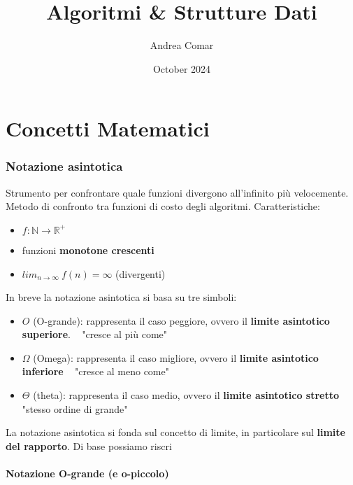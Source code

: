 \documentclass{article}
\title{Algoritmi \& Strutture Dati}
\author{Andrea Comar}
\date{October 2024}
\begin{document}
\maketitle
\newpage
\tableofcontents
\newpage

\part{Concetti Matematici}
\section{Notazione asintotica} %
Strumento per confrontare quale funzioni divergono all'infinito più velocemente. Metodo di confronto 
tra funzioni di costo degli algoritmi. Caratteristiche:
\begin{itemize}
    \item $f: \mathbb{N} \rightarrow \mathbb{R^+}$
    \item funzioni \textbf{monotone crescenti}
    \item $lim_{n \rightarrow \infty} \ f(n) = \infty$ (divergenti)
\end{itemize}

In breve la notazione asintotica si basa su tre simboli:
\begin{itemize}
    \item $O$ (O-grande): rappresenta il caso peggiore, ovvero il \textbf{limite asintotico superiore}. ~ "cresce al più come"
    \item $\Omega$ (Omega): rappresenta il caso migliore, ovvero il \textbf{limite asintotico inferiore} ~ "cresce al meno come"
    \item $\Theta$ (theta): rappresenta il caso medio, ovvero il \textbf{limite asintotico stretto} ~ "stesso ordine di grande"
\end{itemize}
La notazione asintotica si fonda sul concetto di limite, in particolare sul \textbf{limite del rapporto}. Di base possiamo riscri


\subsection{Notazione O-grande (e o-piccolo)} %
\end{document}
